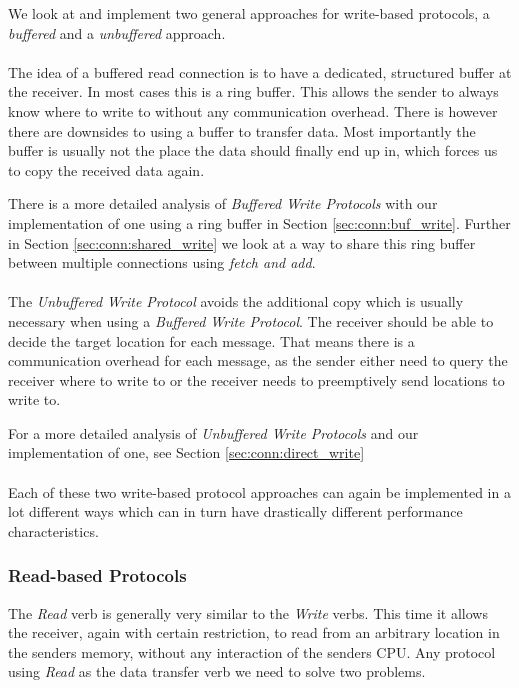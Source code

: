 We look at and implement two general approaches for write-based protocols, a \emph{buffered} and a \emph{unbuffered} approach.

\paragraph{} The idea of a buffered read connection is to have a dedicated, structured buffer at the receiver. In most cases 
this is a ring buffer. This allows the sender to always know where to write to without any communication overhead. There is
however there are downsides to using a buffer to transfer data. Most importantly the buffer is usually not the place the 
data should finally end up in, which forces us to copy the received data again.

There is a more detailed analysis of \emph{Buffered Write Protocols} with our implementation of one using a ring buffer in 
Section \ref{sec:conn:buf_write}. Further in Section \ref{sec:conn:shared_write} we look at a way to share this ring
buffer between multiple connections using \emph{fetch and add}.


\paragraph{} The  \emph{Unbuffered Write Protocol} avoids the additional copy which is usually necessary when 
using a \emph{Buffered Write Protocol}. The receiver should be able to decide the target location for each message. 
That means there is a communication overhead for each message, as the sender either need to query the receiver where to 
write to or the receiver needs to preemptively send locations to write to.

For a more detailed analysis of \emph{Unbuffered Write Protocols} and our implementation of one, 
see Section \ref{sec:conn:direct_write}


\paragraph{}Each of these two write-based protocol approaches can again be implemented in a lot different ways which can
in turn have drastically different performance characteristics. 


\subsubsection{Read-based Protocols}
The \emph{Read} verb is generally very similar to the \emph{Write} verbs. This time it allows the receiver, again with certain
restriction, to read from an arbitrary location in the senders memory, without any interaction of the senders CPU. Any protocol
using \emph{Read} as the data transfer verb we need to solve two problems.

